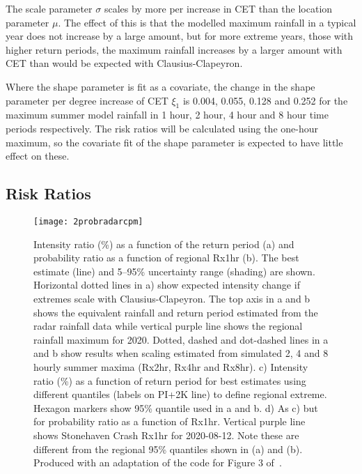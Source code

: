 The scale parameter $\sigma$ scales by more per increase in CET than the location parameter $\mu$.
The effect of this is that the modelled maximum rainfall in a typical year does not increase by a large amount,
    but for more extreme years, those with higher return periods,
    the maximum rainfall increases by a larger amount with CET than would be expected with Clausius-Clapeyron.

Where the shape parameter is fit as a covariate,
    the change in the shape parameter per degree increase of CET $\xi_1$ is
    0.004, 0.055, 0.128 and 0.252 for the maximum summer model rainfall in
    1 hour, 2 hour, 4 hour and 8 hour time periods respectively.
The risk ratios will be calculated using the one-hour maximum,
    so the covariate fit of the shape parameter is expected to have little effect on these.

\subsection{Risk Ratios}\label{subsec:riskratio}

\begin{figure}[H]
    \centering
    \texttt{[image: 2probradarcpm]}
    \caption[Intensity ratio (\%) as a function of the return period (a,c) and
    probability ratio as a function of regional Rx1hr (b, d).
    ]{
        Intensity ratio (\%) as a function of the return period (a) and
    probability ratio as a function of regional Rx1hr (b).
    The best estimate (line) and 5--95\% uncertainty range (shading) are shown.
    Horizontal dotted lines in a) show expected intensity change if extremes scale with Clausius-Clapeyron.
    The top axis in a and b shows the equivalent rainfall and return period estimated from the radar rainfall data while
    vertical purple line shows the regional rainfall maximum for 2020.
    Dotted, dashed and dot-dashed lines in a and b show results when scaling estimated from simulated 2, 4 and 8 hourly summer maxima (Rx2hr, Rx4hr and Rx8hr).
    c) Intensity ratio (\%) as a function of return period for best estimates using different quantiles (labels on PI+2K line) to define regional extreme.
    Hexagon markers show 95\% quantile used in a and b.
    d) As c) but for probability ratio as a function of Rx1hr.
    Vertical purple line shows Stonehaven Crash Rx1hr for 2020-08-12.
    Note these are different from the regional 95\% quantiles shown in (a) and (b).
    Produced with an adaptation of the code for Figure 3 of~\cite{Tett_Soon}.}
    \label{fig:2probradarcpm}
\end{figure}


